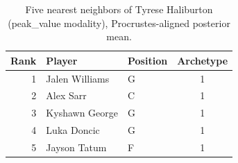 \begin{table}[htbp]
  \centering\small
  \begin{tabular}{rllc}
    \toprule
    Rank & Player & Position & Archetype \\
    \midrule
    1 & Jalen Williams & G & 1 \\
    2 & Alex Sarr & C & 1 \\
    3 & Kyshawn George & G & 1 \\
    4 & Luka Doncic & G & 1 \\
    5 & Jayson Tatum & F & 1 \\
    \bottomrule
  \end{tabular}
  \caption{Five nearest neighbors of Tyrese Haliburton (peak_value modality), Procrustes-aligned posterior mean.}
  \label{tab:Tyrese_Haliburton_neighbors_peak_value}
\end{table}

